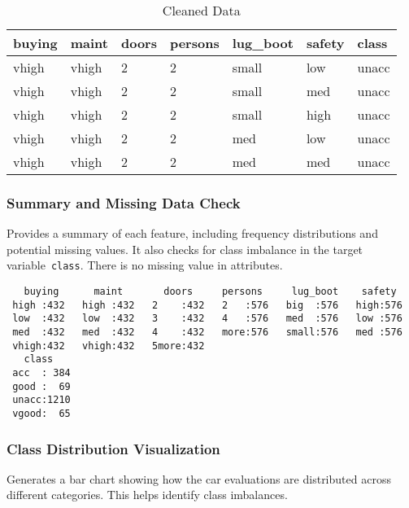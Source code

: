 \documentclass[
  letterpaper,
  DIV=11,
  numbers=noendperiod]{scrartcl}
\begin{document}
\begin{longtable}[]{@{}lllllll@{}}

\caption{\label{tbl-cleaned_data}Cleaned Data}

\tabularnewline

\toprule\noalign{}
buying & maint & doors & persons & lug\_boot & safety & class \\
\midrule\noalign{}
\endhead
\bottomrule\noalign{}
\endlastfoot
vhigh & vhigh & 2 & 2 & small & low & unacc \\
vhigh & vhigh & 2 & 2 & small & med & unacc \\
vhigh & vhigh & 2 & 2 & small & high & unacc \\
vhigh & vhigh & 2 & 2 & med & low & unacc \\
vhigh & vhigh & 2 & 2 & med & med & unacc \\

\end{longtable}

\subsubsection{Summary and Missing Data
Check}\label{summary-and-missing-data-check}

Provides a summary of each feature, including frequency distributions
and potential missing values. It also checks for class imbalance in the
target variable~\texttt{class}. There is no missing value in attributes.

\begin{verbatim}
   buying      maint       doors     persons     lug_boot    safety   
 high :432   high :432   2    :432   2   :576   big  :576   high:576  
 low  :432   low  :432   3    :432   4   :576   med  :576   low :576  
 med  :432   med  :432   4    :432   more:576   small:576   med :576  
 vhigh:432   vhigh:432   5more:432                                    
   class     
 acc  : 384  
 good :  69  
 unacc:1210  
 vgood:  65  
\end{verbatim}

\subsubsection{Class Distribution
Visualization}\label{class-distribution-visualization}

Generates a bar chart showing how the car evaluations are distributed
across different categories. This helps identify class imbalances.
\end{document}
